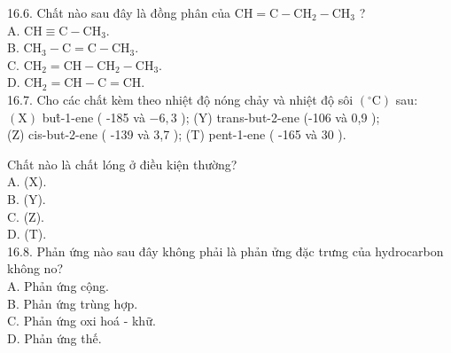 \documentclass[10pt]{article}
\begin{document}
16.6. Chất nào sau đây là đồng phân của $\mathrm{CH}=\mathrm{C}-\mathrm{CH}_{2}-\mathrm{CH}_{3}$ ?\\
A. $\mathrm{CH} \equiv \mathrm{C}-\mathrm{CH}_{3}$.\\
B. $\mathrm{CH}_{3}-\mathrm{C}=\mathrm{C}-\mathrm{CH}_{3}$.\\
C. $\mathrm{CH}_{2}=\mathrm{CH}-\mathrm{CH}_{2}-\mathrm{CH}_{3}$.\\
D. $\mathrm{CH}_{2}=\mathrm{CH}-\mathrm{C}=\mathrm{CH}$.\\
16.7. Cho các chất kèm theo nhiệt độ nóng chảy và nhiệt độ sôi $\left({ }^{\circ} \mathrm{C}\right)$ sau:\\
$(\mathrm{X})$ but̂-1-ene ( -185 và $-6,3$ ); (Y) trans-but-2-ene (-106 và 0,9 );\\
(Z) cis-but-2-ene ( -139 và 3,7 ); (T) pent-1-ene ( -165 và 30 ).

Chất nào là chất lóng ở điều kiện thường?\\
A. (X).\\
B. (Y).\\
C. (Z).\\
D. (T).\\
16.8. Phản ứng nào sau đây không phải là phản ửng đặc trưng của hydrocarbon không no?\\
A. Phản ứng cộng.\\
B. Phản ứng trùng hợp.\\
C. Phản ứng oxi hoá - khữ.\\
D. Phản ứng thế.
\end{document}
